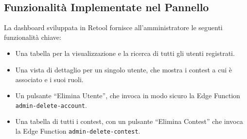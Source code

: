 \subsection{Funzionalità Implementate nel Pannello}\label{subsec:funzionalita-implementate-nel-pannello}
La dashboard sviluppata in Retool fornisce all'amministratore le seguenti funzionalità chiave:
\begin{itemize}
    \item Una tabella per la visualizzazione e la ricerca di tutti gli utenti registrati.
    \item Una vista di dettaglio per un singolo utente, che mostra i contest a cui è associato e i suoi ruoli.
    \item Un pulsante ``Elimina Utente'', che invoca in modo sicuro la Edge Function \texttt{admin-delete-account}.
    \item Una tabella di tutti i contest, con un pulsante ``Elimina Contest'' che invoca la Edge Function \texttt{admin-delete-contest}.
\end{itemize}